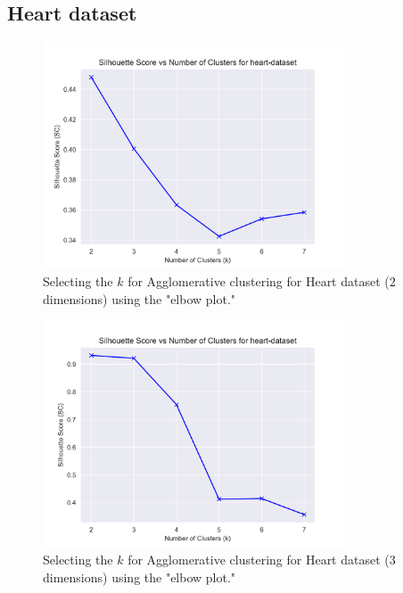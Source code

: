 \subsection{Heart dataset}
\begin{figure}[H]
  \includegraphics[width=0.8\textwidth]{Appendix/parameter-selection/heart-dataset_agglomerative_optimal_cluster_2.png}
  \caption{Selecting the $k$ for Agglomerative clustering for Heart dataset (2 dimensions) using the "elbow plot."}
  \label{hyperparameters:agglomerative-heart-dataset-2d}
\end{figure}
\begin{figure}[H]
  \includegraphics[width=0.8\textwidth]{Appendix/parameter-selection/heart-dataset_agglomerative_optimal_cluster_3.png}
  \caption{Selecting the $k$ for Agglomerative clustering for Heart dataset (3 dimensions) using the "elbow plot."}
  \label{hyperparameters:agglomerative-heart-dataset-3d}
\end{figure}
